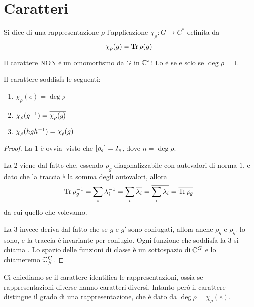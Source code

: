 \section{Caratteri}

\begin{mydef}
  Si dice  di una rappresentazione $\rho$ l'applicazione $\chi_\rho: G \rightarrow C^*$ definita da 
  \[
  \chi_\rho(g)=\operatorname{Tr} \rho(g)
  \]
\end{mydef}

\begin{Achtung}
  Il carattere \underline{NON} è un omomorfismo da $G$ in $\mathbb C^*$! Lo è se e solo se $\deg \rho = 1$. 
\end{Achtung}

\begin{myprop}
  Il carattere soddisfa le seguenti:
  \begin{enumerate}
    \item $\chi_\rho(e)=\deg\rho$
    \item $\chi_\rho(g^{-1})=\overline{\chi_\rho(g)}$
    \item $\chi_\rho(hgh^{-1})=\chi_\rho(g)$
  \end{enumerate}
\end{myprop}

\begin{proof}
  La 1 è ovvia, visto che $[\rho_e]= I_n$, dove $n=\deg \rho$.
  
  La 2 viene dal fatto che, essendo $\rho_g$ diagonalizzabile con autovalori di norma $1$, e dato che la traccia è la somma degli autovalori, allora
  \[
		\operatorname{Tr}\rho_g^{-1} = \sum_i \lambda_i^{-1} = \sum_i \overline{\lambda_i} = \overline{\sum_i \lambda_i} = \overline{\operatorname{Tr}\rho_g} 
  \]
  da cui quello che volevamo.
  
La 3 invece deriva dal fatto che se $g$ e $g'$ sono coniugati, allora anche $\rho_g$ e $\rho_{g'}$ lo sono, e la traccia è invariante per coniugio. Ogni funzione che soddisfa la 3 si chiama . Lo spazio delle funzioni di classe è un sottospazio di $\mathbb C^{G}$ e lo chiameremo $\mathbb C^{G}_\#$.
\end{proof}

Ci chiediamo se il carattere identifica le rappresentazioni, ossia se rappresentazioni diverse hanno caratteri diversi.
Intanto però il carattere distingue il grado di una rappresentazione, che è dato da $\deg \rho = \chi_\rho(e)$.

